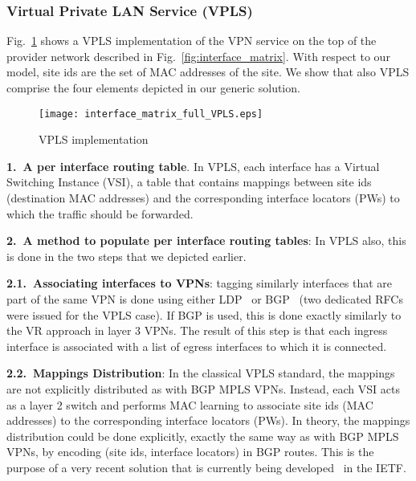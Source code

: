 	






\subsubsection{Virtual Private LAN Service (VPLS)}
Fig.~\ref{fig:vpls} shows a VPLS implementation of the VPN service on the top of the provider network described in Fig.~\ref{fig:interface_matrix}. With respect to our model, site ids are the set of MAC addresses of the site. We show that also VPLS comprise the four elements depicted in our generic solution.
\begin{figure}[h]
	\centering
		\texttt{[image: interface\_matrix\_full\_VPLS.eps]}
		\caption{VPLS implementation}\label{fig:vpls}
\end{figure}

\vspace{1mm}\noindent \textbf{1.~A per interface routing table}. In VPLS, each interface has a Virtual Switching Instance (VSI), a table that contains mappings between site ids (destination MAC addresses) and the corresponding interface locators (PWs) to which the traffic should be forwarded.
	
	\vspace{1mm}\noindent \textbf{2.~A method to populate per interface routing tables}: In VPLS also, this is done in the two steps that we depicted earlier.
	
			\vspace{1mm}\noindent \textbf{2.1.~Associating interfaces to VPNs}: tagging similarly interfaces that are part of the same VPN is done using either LDP~\cite{rfc4762} or BGP~\cite{rfc4762} (two dedicated RFCs were issued for the VPLS case). If BGP is used, this is done exactly similarly to the VR approach in layer 3 VPNs. The result of this step is that each ingress interface is associated with a list of egress interfaces to which it is connected.
			


		\vspace{1mm}\noindent \textbf{2.2.~Mappings Distribution}: In the classical VPLS standard, the mappings are not explicitly distributed as with BGP MPLS VPNs. Instead, each VSI acts as a layer 2 switch and performs MAC learning to associate site ids (MAC addresses) to the corresponding interface locators (PWs).
			In theory, the mappings distribution could be done explicitly, exactly the same way as with BGP MPLS VPNs, by encoding (site ids, interface locators) in BGP routes. This is the purpose of a very recent solution that is currently being developed~\cite{MAC-VPN} in the IETF.
		
